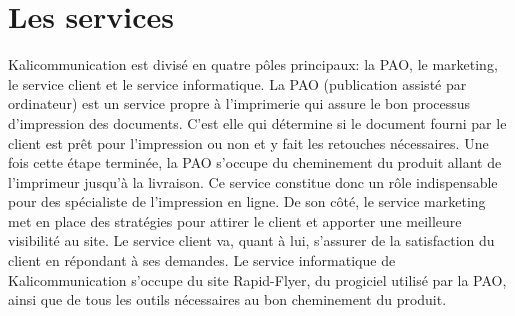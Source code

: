 \documentclass[a4paper]{report}
\begin{document}
\section{Les services}
Kalicommunication est divisé en quatre pôles principaux: la PAO, le marketing, le service client et le service informatique.\newline
La PAO (publication assisté par ordinateur) est un service propre à l'imprimerie qui assure le bon processus d'impression des documents. C'est elle qui détermine si le document fourni par le client est prêt pour l'impression ou non et y fait les retouches nécessaires. Une fois cette étape terminée, la PAO s'occupe du cheminement du produit allant de l'imprimeur jusqu'à la livraison. Ce service constitue donc un rôle indispensable pour des spécialiste de l'impression en ligne.\newline
De son côté, le service marketing met en place des stratégies pour attirer le client et apporter une meilleure visibilité au site.\newline
Le service client va, quant à lui, s'assurer de la satisfaction du client en répondant à ses demandes.\newline
Le service informatique de Kalicommunication s'occupe du site Rapid-Flyer, du progiciel utilisé par la PAO, ainsi que de tous les outils nécessaires au bon cheminement du produit.
\end{document}

